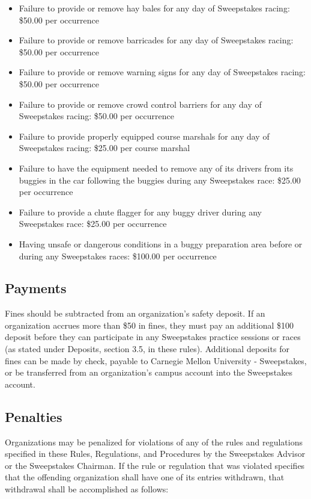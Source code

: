 \documentclass[openany]{book}
\begin{document}
\begin{itemize}
	\item Failure to provide or remove hay bales for any day of Sweepstakes racing: \$50.00 per occurrence
	\item Failure to provide or remove barricades for any day of Sweepstakes racing: \$50.00 per occurrence
	\item Failure to provide or remove warning signs for any day of Sweepstakes racing: \$50.00 per occurrence
	\item Failure to provide or remove crowd control barriers for any day of Sweepstakes racing: \$50.00 per occurrence
	\item Failure to provide properly equipped course marshals for any day of Sweepstakes racing: \$25.00 per course marshal
	\item Failure to have the equipment needed to remove any of its drivers from its buggies in the car following the buggies during any Sweepstakes race: \$25.00 per occurrence
	\item Failure to provide a chute flagger for any buggy driver during any Sweepstakes race: \$25.00 per occurrence
	\item Having unsafe or dangerous conditions in a buggy preparation area before or during any Sweepstakes races: \$100.00 per occurrence
\end{itemize}

\subsection{Payments}

Fines should be subtracted from an organization's safety deposit. If an organization accrues more than \$50 in fines, they must pay an additional \$100 deposit before they can participate in any Sweepstakes practice sessions or races (as stated under Deposits, section 3.5, in these rules). Additional deposits for fines can be made by check, payable to Carnegie Mellon University - Sweepstakes, or be transferred from an organization's campus account into the Sweepstakes account.

\subsection{Penalties}
Organizations may be penalized for violations of any of the rules and regulations specified in these Rules, Regulations, and Procedures by the Sweepstakes Advisor or the Sweepstakes Chairman. If the rule or regulation that was violated specifies that the offending organization shall have one of its entries withdrawn, that withdrawal shall be accomplished as follows:
\end{document}
